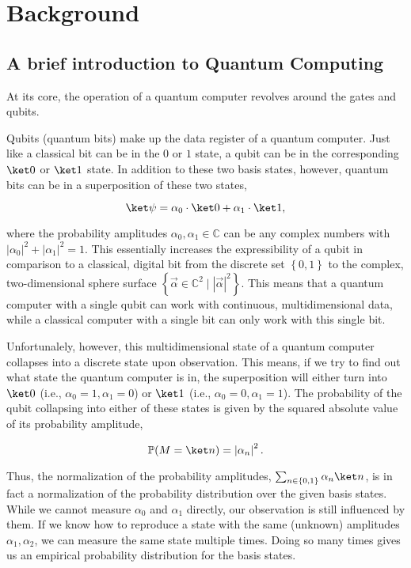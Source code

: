 \chapter{Background}
\label{chap:background}

\section{A brief introduction to Quantum Computing}
At its core, the operation of a quantum computer revolves around the gates and
qubits.

Qubits (quantum bits) make up the data register of a quantum computer.
Just like a classical bit can be in the $0$ or $1$ state, a qubit can be in the
corresponding $\ket 0$ or $\ket 1$ state.
In addition to these two basis states, however, quantum bits can be in a
superposition of these two states,

$$\ket \psi = \alpha_0 \cdot \ket 0 + \alpha_1 \cdot \ket 1,$$

where the probability amplitudes $\alpha_0, \alpha_1 \in \mathbb C$ can be any
complex numbers with $\left|\alpha_0\right|^2 + \left|\alpha_1\right|^2 = 1$.
This essentially increases the expressibility of a qubit in comparison to a
classical, digital bit from the discrete set $\left\{0, 1\right\}$ to the complex,
two-dimensional sphere surface
$\left\{\vec \alpha \in \mathbb C^2 \mid \left|\vec\alpha\right|^2\right\}$.
This means that a quantum computer with a single qubit can work with continuous,
multidimensional data, while a classical computer with a single bit can only
work with this single bit.

Unfortunalely, however, this multidimensional state of a quantum computer
collapses into a discrete state upon observation.
This means, if we try to find out what state the quantum computer is in, the
superposition will either turn into $\ket 0$ (i.e., $\alpha_0 = 1, \alpha_1 = 0$)
or $\ket 1$ (i.e., $\alpha_0 = 0, \alpha_1 = 1$).
The probability of the qubit collapsing into either of these states is given by
the squared absolute value of its probability amplitude,

$$\mathbb P(M = \ket n) = \left| \alpha_n \right|^2.$$

Thus, the normalization of the probability amplitudes, 
$\sum_{n \in \left\{0, 1\right\}} \alpha_n \ket n$, is in fact a normalization
of the probability distribution over the given basis states.
While we cannot measure $\alpha_0$ and $\alpha_1$ directly, our observation is
still influenced by them.
If we know how to reproduce a state with the same (unknown) amplitudes
$\alpha_1, \alpha_2$, we can measure the same state multiple times.
Doing so many times gives us an empirical probability distribution for the basis
states.

